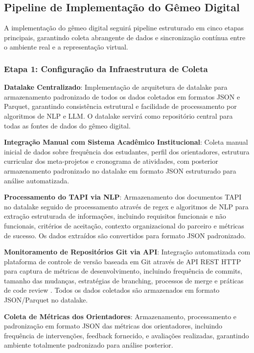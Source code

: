\documentclass[12pt,a4paper]{article}
\renewcommand{\cite}[1]{}
\begin{document}
\subsection{Pipeline de Implementação do Gêmeo Digital}

A implementação do gêmeo digital seguirá pipeline
estruturado em cinco etapas principais, garantindo coleta abrangente de dados e
sincronização contínua entre o ambiente real e a representação virtual.

\subsubsection{Etapa 1: Configuração da Infraestrutura de Coleta}

\textbf{Datalake Centralizado}: Implementação de arquitetura de datalake para armazenamento padronizado de todos os dados coletados em formatos JSON e Parquet, garantindo consistência estrutural e facilidade de processamento por algoritmos de NLP e LLM. O datalake servirá como repositório central para todas as fontes de dados do gêmeo digital.

\textbf{Integração Manual com Sistema Acadêmico Institucional}: Coleta manual inicial de dados sobre frequência dos estudantes, perfil dos orientadores, estrutura curricular dos meta-projetos e cronograma de atividades, com posterior armazenamento padronizado no datalake em formato JSON estruturado para análise automatizada.

\textbf{Processamento do TAPI via NLP}: Armazenamento dos documentos TAPI no datalake seguido de processamento através de regex e algoritmos de NLP para extração estruturada de informações, incluindo requisitos funcionais e não funcionais, critérios de aceitação, contexto organizacional do parceiro e métricas de sucesso. Os dados extraídos são convertidos para formato JSON padronizado.

\textbf{Monitoramento de Repositórios Git via API}: Integração automatizada com plataforma de controle de versão baseada em Git através de API REST HTTP \cite{kalliamvakou2014} para captura de métricas de desenvolvimento, incluindo frequência de commits, tamanho das mudanças, estratégias de branching, processos de merge e práticas de code review \cite{perezriverol2016}. Todos os dados coletados são armazenados em formato JSON/Parquet no datalake.

\textbf{Coleta de Métricas dos Orientadores}: Armazenamento, processamento e padronização em formato JSON das métricas dos orientadores, incluindo frequência de intervenções, feedback fornecido, e avaliações realizadas, garantindo ambiente totalmente padronizado para análise posterior.
\end{document}
